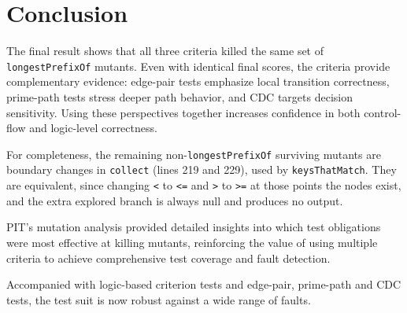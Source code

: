 \chapter{Conclusion} \label{cap:conclusion}

The final result shows that all three criteria killed the same set of \texttt{longestPrefixOf} mutants.
Even with identical final scores, the criteria provide complementary evidence: edge-pair tests emphasize local transition correctness, prime-path tests stress deeper path behavior, and CDC targets decision sensitivity.
Using these perspectives together increases confidence in both control-flow and logic-level correctness.

For completeness, the remaining non-\texttt{longestPrefixOf} surviving mutants are boundary changes in
\texttt{collect} (lines 219 and 229), used by \texttt{keysThatMatch}.
They are equivalent, since changing \texttt{<} to \texttt{<=} and \texttt{>} to \texttt{>=} at those points the nodes exist, and the extra explored branch is always null and produces no output.

PIT's mutation analysis provided detailed insights into which test obligations were most effective at killing mutants, reinforcing the value of using multiple criteria to achieve comprehensive test coverage and fault detection.

Accompanied with logic-based criterion tests and edge-pair, prime-path and CDC tests, the test suit is now robust against a wide range of faults.